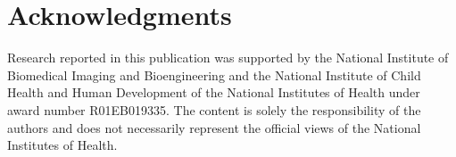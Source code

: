 \documentclass[conference]{IEEEtran}
\begin{document}
\section*{Acknowledgments}
Research reported in this publication was supported by the
National Institute of Biomedical Imaging and Bioengineering  and the National Institute of Child Health and Human Development of the National Institutes of Health
under award number R01EB019335.  The content is solely
the responsibility of the authors and does not necessarily
represent the official views of the National Institutes of Health.
%
\end{document}
